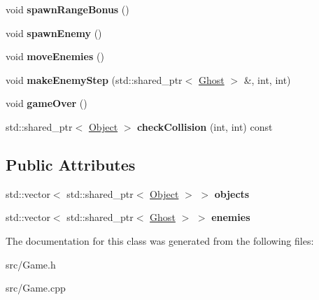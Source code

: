 \begin{DoxyCompactItemize}
\mbox{\label{class_game_a2cc8bc60213d0effd957efe54929e211}} 
void {\bfseries spawn\+Range\+Bonus} ()
\item 
\mbox{\label{class_game_ad7a4181414089729ddea00c053f822c4}} 
void {\bfseries spawn\+Enemy} ()
\item 
\mbox{\label{class_game_a5a2ab72063d3d3f01c71b4318c840128}} 
void {\bfseries move\+Enemies} ()
\item 
\mbox{\label{class_game_a804b2020e35a77740013a4ceff317a56}} 
void {\bfseries make\+Enemy\+Step} (std\+::shared\+\_\+ptr$<$ \mbox{\hyperlink{class_ghost}{Ghost}} $>$ \&, int, int)
\item 
\mbox{\label{class_game_ac7d371f3f30513a4f3c57f521fac9b5f}} 
void {\bfseries game\+Over} ()
\item 
\mbox{\label{class_game_a3db24dd3d83502f3c31117768da3f0ab}} 
std\+::shared\+\_\+ptr$<$ \mbox{\hyperlink{class_object}{Object}} $>$ {\bfseries check\+Collision} (int, int) const
\end{DoxyCompactItemize}
\subsection*{Public Attributes}
\begin{DoxyCompactItemize}
\item 
\mbox{\label{class_game_a7d6d3826cb7f43f8aafc9e949c93c80a}} 
std\+::vector$<$ std\+::shared\+\_\+ptr$<$ \mbox{\hyperlink{class_object}{Object}} $>$ $>$ {\bfseries objects}
\item 
\mbox{\label{class_game_a1aebd70d2399cf4368cbc1d1e31110ec}} 
std\+::vector$<$ std\+::shared\+\_\+ptr$<$ \mbox{\hyperlink{class_ghost}{Ghost}} $>$ $>$ {\bfseries enemies}
\end{DoxyCompactItemize}


The documentation for this class was generated from the following files\+:\begin{DoxyCompactItemize}
\item 
src/Game.\+h\item 
src/Game.\+cpp\end{DoxyCompactItemize}
